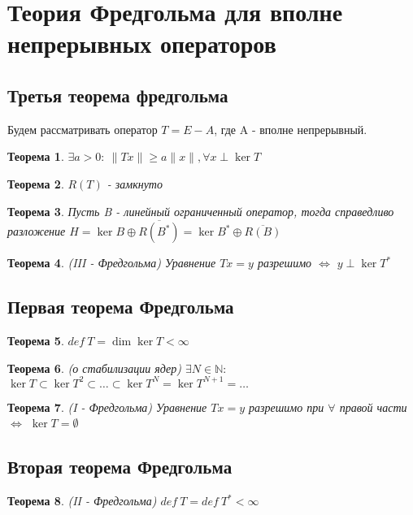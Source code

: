 \documentclass[9pt, a4paper]{extarticle}
\newtheorem{theorem}{Теорема}
\numberwithin{equation}{section}
\numberwithin{lemma}{section}
\numberwithin{definition}{section}
\numberwithin{notabene}{section}
\numberwithin{corollary}{section}
\begin{document}
\section{Теория Фредгольма для вполне непрерывных операторов}
\subsection{Третья теорема фредгольма}
	Будем рассматривать оператор $T = E - A$, где A - вполне непрерывный.
	\begin{theorem}
		$\exists a > 0: \ \|Tx\| \geq a \|x\|, \forall x \perp \ker{T}$
	\end{theorem}
	\begin{theorem}
		$R(T)$ - замкнуто
	\end{theorem}
	\begin{theorem}
		Пусть B - линейный ограниченный оператор, тогда справедливо разложение $H = \ker B \oplus \overline{R(B^*)} = \ker B^* \oplus \overline{R(B)}$
	\end{theorem}
	\begin{theorem}
		(III - Фредгольма) \newline
		Уравнение $Tx = y$ разрешимо $\Leftrightarrow$ $y \perp \ker T^*$
	\end{theorem}
\subsection{Первая теорема Фредгольма}
	\begin{theorem}
		$def\ T = \dim\ker T < \infty$ 
	\end{theorem}
	\begin{theorem}
		(о стабилизации ядер)\newline
		$\exists N \in \mathbb{N}: $ $\ker T \subset \ker T^2 \subset \dots \subset \ker T^N = \ker T^{N+1} = \dots$
	\end{theorem}
	\begin{theorem}
		(I - Фредгольма) \newline
		Уравнение $Tx = y$ разрешимо при $\forall$ правой части $\Leftrightarrow$ $\ker{T} = \emptyset$
	\end{theorem}
\subsection{Вторая теорема Фредгольма}
	\begin{theorem}
		(II - Фредгольма) \newline
		$def\ T = def\ T^* < \infty$
	\end{theorem}
\end{document}
